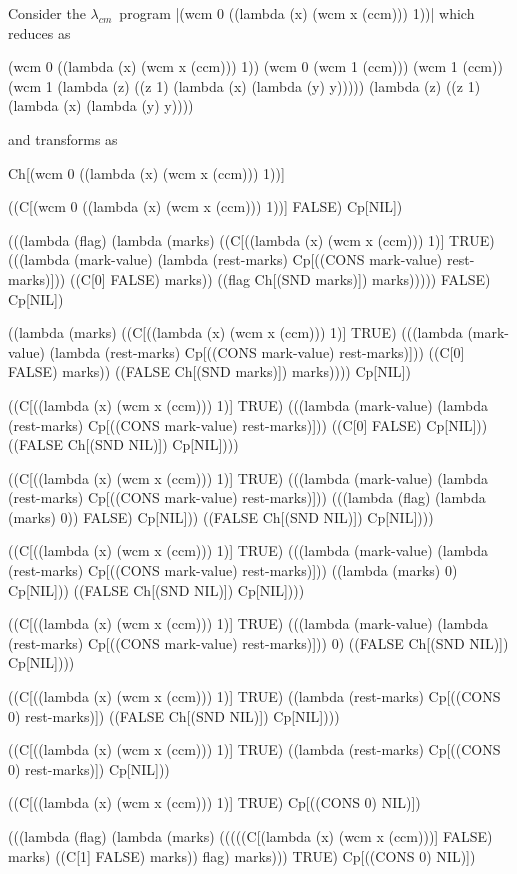 \documentclass[ms,electronic,twosidetoc,letterpaper,chaptercenter,parttop]{byumsphd}
\newcommand{\cm}{$\lambda_{cm}$}
\begin{document}
Consider the \cm\ program \scheme|(wcm 0 ((lambda (x) (wcm x (ccm))) 1))| which reduces as
\begin{schemedisplay}
(wcm 0 ((lambda (x) (wcm x (ccm))) 1))
(wcm 0 (wcm 1 (ccm)))
(wcm 1 (ccm))
(wcm 1 (lambda (z) ((z 1) (lambda (x) (lambda (y) y)))))
(lambda (z) ((z 1) (lambda (x) (lambda (y) y))))
\end{schemedisplay}
and transforms as
\begin{schemedisplay}
Ch[(wcm 0 ((lambda (x) (wcm x (ccm))) 1))]

((C[(wcm 0 ((lambda (x) (wcm x (ccm))) 1))] FALSE) Cp[NIL])

(((lambda (flag)
    (lambda (marks)
      ((C[((lambda (x) (wcm x (ccm))) 1)] TRUE)
       (((lambda (mark-value) (lambda (rest-marks) Cp[((CONS mark-value) rest-marks)]))
         ((C[0] FALSE) marks)) ((flag Ch[(SND marks)]) marks)))))
  FALSE) Cp[NIL])

((lambda (marks)
   ((C[((lambda (x) (wcm x (ccm))) 1)] TRUE)
    (((lambda (mark-value) (lambda (rest-marks) Cp[((CONS mark-value) rest-marks)]))
      ((C[0] FALSE) marks)) ((FALSE Ch[(SND marks)]) marks))))
 Cp[NIL])

((C[((lambda (x) (wcm x (ccm))) 1)] TRUE)
 (((lambda (mark-value) (lambda (rest-marks) Cp[((CONS mark-value) rest-marks)]))
   ((C[0] FALSE) Cp[NIL])) ((FALSE Ch[(SND NIL)]) Cp[NIL])))

((C[((lambda (x) (wcm x (ccm))) 1)] TRUE)
 (((lambda (mark-value) (lambda (rest-marks) Cp[((CONS mark-value) rest-marks)]))
   (((lambda (flag) (lambda (marks) 0)) FALSE) Cp[NIL])) ((FALSE Ch[(SND NIL)]) Cp[NIL])))

((C[((lambda (x) (wcm x (ccm))) 1)] TRUE)
 (((lambda (mark-value) (lambda (rest-marks) Cp[((CONS mark-value) rest-marks)]))
   ((lambda (marks) 0) Cp[NIL])) ((FALSE Ch[(SND NIL)]) Cp[NIL])))

((C[((lambda (x) (wcm x (ccm))) 1)] TRUE)
 (((lambda (mark-value) (lambda (rest-marks) Cp[((CONS mark-value) rest-marks)]))
   0) ((FALSE Ch[(SND NIL)]) Cp[NIL])))

((C[((lambda (x) (wcm x (ccm))) 1)] TRUE)
 ((lambda (rest-marks) Cp[((CONS 0) rest-marks)])
  ((FALSE Ch[(SND NIL)]) Cp[NIL])))

((C[((lambda (x) (wcm x (ccm))) 1)] TRUE)
 ((lambda (rest-marks) Cp[((CONS 0) rest-marks)])
  Cp[NIL]))

((C[((lambda (x) (wcm x (ccm))) 1)] TRUE) Cp[((CONS 0) NIL)])

(((lambda (flag)
    (lambda (marks)
      (((((C[(lambda (x) (wcm x (ccm)))] FALSE) marks)
         ((C[1] FALSE) marks))
        flag)
       marks))) TRUE) Cp[((CONS 0) NIL)])


\end{schemedisplay}
\end{document}
